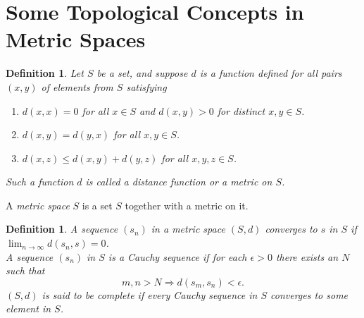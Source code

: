 \documentclass[12pt, lettersize]{book}
\newtheorem{dfn}[thm]{Definition}
\begin{document}
	\section{Some Topological Concepts in Metric Spaces}
	\begin{dfn}
		Let $S$ be a set, and suppose $d$ is a function defined for all pairs $(x,y)$ of elements from $S$ satisfying
		\begin{enumerate}
			\item $d(x,x)=0$ for all $x\in S$ and $d(x,y)>0$ for distinct $x,y\in S$.
			\item $d(x,y)=d(y,x)$ for all $x,y\in S$.
			\item $d(x,z)\leq d(x,y)+d(y,z)$ for all $x,y,z\in S$.
		\end{enumerate}
		Such a function $d$ is called a \emph{distance function} or a \emph{metric} on $S$.
	\end{dfn}
	A \emph{metric space} $S$ is a set $S$ together with a metric on it.
	
	\begin{dfn}
		A sequence $(s_n)$ in a metric space $(S,d)$ converges to $s$ in $S$ if $\lim_{n\rightarrow\infty}d(s_n,s)=0$.\\ 
		A sequence $(s_n)$ in $S$ is a \emph{Cauchy sequence} if for each $\epsilon>0$ there exists an $N$ such that
		\begin{displaymath}
			m,n>N\Rightarrow d(s_m,s_n)<\epsilon.
		\end{displaymath}
		$(S,d)$ is said to be \emph{complete} if every Cauchy sequence in $S$ converges to some element in $S$.
	\end{dfn}
	
\end{document}
